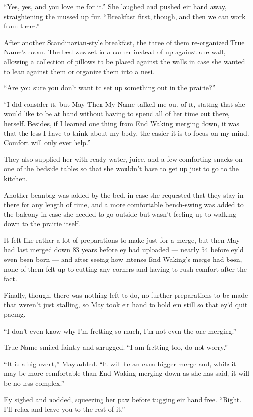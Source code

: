 ``Yes, yes, and you love me for it.'' She laughed and pushed eir hand away, straightening the mussed up fur. ``Breakfast first, though, and then we can work from there.''

After another Scandinavian-style breakfast, the three of them re-organized True Name's room. The bed was set in a corner instead of up against one wall, allowing a collection of pillows to be placed against the walls in case she wanted to lean against them or organize them into a nest.

``Are you sure you don't want to set up something out in the prairie?''

``I did consider it, but May Then My Name talked me out of it, stating that she would like to be at hand without having to spend all of her time out there, herself. Besides, if I learned one thing from End Waking merging down, it was that the less I have to think about my body, the easier it is to focus on my mind. Comfort will only ever help.''

They also supplied her with ready water, juice, and a few comforting snacks on one of the bedside tables so that she wouldn't have to get up just to go to the kitchen.

Another beanbag was added by the bed, in case she requested that they stay in there for any length of time, and a more comfortable bench-swing was added to the balcony in case she needed to go outside but wasn't feeling up to walking down to the prairie itself.

It felt like rather a lot of preparations to make just for a merge, but then May had last merged down 83 years before ey had uploaded — nearly 64 before ey'd even been born — and after seeing how intense End Waking's merge had been, none of them felt up to cutting any corners and having to rush comfort after the fact.

Finally, though, there was nothing left to do, no further preparations to be made that weren't just stalling, so May took eir hand to hold em still so that ey'd quit pacing.

``I don't even know why I'm fretting so much, I'm not even the one merging.''

True Name smiled faintly and shrugged. ``I am fretting too, do not worry.''

``It is a big event,'' May added. ``It will be an even bigger merge and, while it may be more comfortable than End Waking merging down as she has said, it will be no less complex.''

Ey sighed and nodded, squeezing her paw before tugging eir hand free. ``Right. I'll relax and leave you to the rest of it.''

